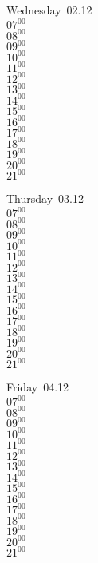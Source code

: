 \documentclass[11pt,a4paper]{book}\usepackage[]{graphicx}\usepackage[]{color}
\begin{document}
\begin{weekdaybox}
  Wednesday~02.12\\
  { 
  \vfill
  $07^{00}$\\
$08^{00}$\\
$09^{00}$\\
$10^{00}$\\
$11^{00}$\\
$12^{00}$\\
$13^{00}$\\
$14^{00}$\\
$15^{00}$\\
$16^{00}$\\
$17^{00}$\\
$18^{00}$\\
$19^{00}$\\
$20^{00}$\\
$21^{00}$\\
  }
\end{weekdaybox}
\clearpage
\begin{headerbox}
\end{headerbox}
\begin{weekdaybox}
  Thursday~03.12\\
  { 
  \vfill
  $07^{00}$\\
$08^{00}$\\
$09^{00}$\\
$10^{00}$\\
$11^{00}$\\
$12^{00}$\\
$13^{00}$\\
$14^{00}$\\
$15^{00}$\\
$16^{00}$\\
$17^{00}$\\
$18^{00}$\\
$19^{00}$\\
$20^{00}$\\
$21^{00}$\\
  }
\end{weekdaybox} 
\begin{weekdaybox}
  Friday~04.12\\
  { 
  \vfill
  $07^{00}$\\
$08^{00}$\\
$09^{00}$\\
$10^{00}$\\
$11^{00}$\\
$12^{00}$\\
$13^{00}$\\
$14^{00}$\\
$15^{00}$\\
$16^{00}$\\
$17^{00}$\\
$18^{00}$\\
$19^{00}$\\
$20^{00}$\\
$21^{00}$\\
  }
\end{weekdaybox}
\end{document}
